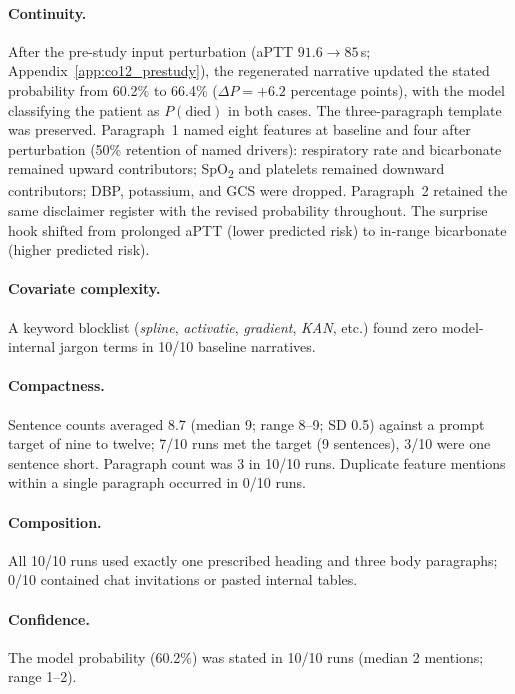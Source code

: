 \documentclass[12pt, a4paper]{article}
\begin{document}
\paragraph{Continuity.}
After the pre-study input perturbation (aPTT $91.6\!\to\!85$\,s;
Appendix~\ref{app:co12_prestudy}), the regenerated narrative updated the
stated probability from 60.2\% to 66.4\% ($\Delta P = +6.2$ percentage
points), with the model classifying the patient as $P(\text{died})$ in
both cases. The three-paragraph
template was preserved. Paragraph~1 named eight features at baseline and
four after perturbation (50\% retention of named drivers): respiratory rate
and bicarbonate remained upward contributors; SpO\textsubscript{2} and
platelets remained downward contributors; DBP, potassium, and GCS were
dropped. Paragraph~2 retained the same disclaimer register with the
revised probability throughout. The surprise hook shifted from prolonged
aPTT (lower predicted risk) to in-range bicarbonate (higher predicted
risk).

\paragraph{Covariate complexity.}
A keyword blocklist (\emph{spline}, \emph{activatie}, \emph{gradient},
\emph{KAN}, etc.) found zero model-internal jargon terms in 10/10 baseline
narratives.

\paragraph{Compactness.}
Sentence counts averaged 8.7 (median 9; range 8--9; SD 0.5) against a
prompt target of nine to twelve; 7/10 runs met the target (9 sentences),
3/10 were one sentence short.
Paragraph count was 3 in 10/10 runs. Duplicate feature mentions within a
single paragraph occurred in 0/10 runs.

\paragraph{Composition.}
All 10/10 runs used exactly one prescribed heading and three body
paragraphs; 0/10 contained chat invitations or pasted internal tables.

\paragraph{Confidence.}
The model probability (60.2\%) was stated in 10/10 runs (median 2
mentions; range 1--2).
\end{document}
